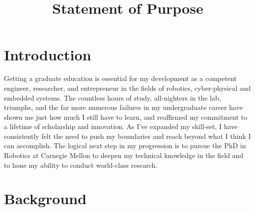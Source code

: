 \documentclass[journal, draftcls]{IEEEtran}
\begin{document}
%
\title{Statement of Purpose}
\author{
}
\maketitle
\section{Introduction}

Getting a graduate education is essential for my development as a competent engineer, researcher, and entrepreneur in the fields of robotics, cyber-physical and embedded systems. The countless hours of study, all-nighters in the lab, triumphs, and the far more numerous failures in my undergraduate career have shown me just how much I still have to learn, and reaffirmed my commitment to a lifetime of scholarship and innovation. As I've expanded my skill-set, I have consistently felt the need to push my  boundaries and reach beyond what I think I can accomplish. The logical next step in my progression is to pursue the PhD in Robotics at Carnegie Mellon to deepen my technical knowledge in the field and to hone my ability to conduct world-class research. 

\section{Background}
\end{document}
